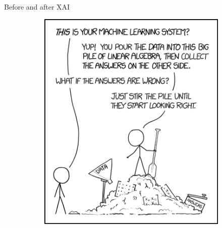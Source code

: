 \begin{frame}{Before and after XAI}
        \begin{figure}
		\centering
		\begin{subfigure}[b]{0.45\textwidth}
			\centering
			\includegraphics[width=\textwidth]{pic/img/XAI/XAIMeme.png}
		\end{subfigure}
		\hfill
		\pause 
		\begin{subfigure}[b]{0.45\textwidth}
			\centering

\end{subfigure}
\end{figure}
\end{frame}
